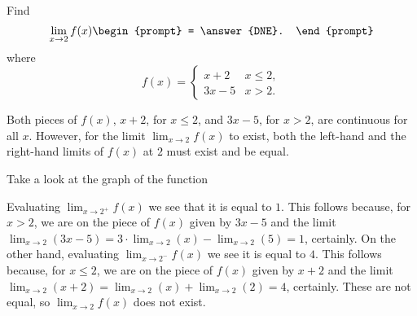 \documentclass{ximera}
\author{Gregory Hartman \and Matthew Carr}
\begin{document}
\begin{exercise}



  Find 
  \[
  \lim_{x\to 2} f(x)
  \begin{prompt}
  = \answer{DNE}.
  \end{prompt}
  \]
  where
  \[
  f(x) = \begin{cases}
    x+2 & x\leq 2, \\
    3x-5 & x>2.
  \end{cases}
  \]
    \begin{hint}
     Both pieces of $f(x)$, $x+2$, for $x\le2$, and $3x-5$, for $x>2$,
     are continuous for all $x$. However, for the limit
     $\lim_{x\to2}f(x)$ to exist, both the left-hand and the
     right-hand limits of $f(x)$ at $2$ must exist and be equal.
    \end{hint}
     \begin{hint}
    	Take a look at the graph of the function
    \begin{center}
      \end{center} 
    \end{hint}
    \begin{hint}
     Evaluating $\lim_{x\to2^{+}}f(x)$ we see that it is equal to
     $1$. This follows because, for $x>2$, we are on the piece of
     $f(x)$ given by $3x-5$ and the limit
     $\lim_{x\to2}\left({3x-5}\right)=3\cdot\lim_{x\to
       2}(x)-\lim_{x\to2}\left({5}\right)=1$, certainly. On the other
     hand, evaluating $\lim_{x\to2^{-}}f(x)$ we see it is equal to
     $4$. This follows because, for $x\le2$, we are on the piece of
     $f(x)$ given by $x+2$ and the limit
     $\lim_{x\to2}\left({x+2}\right)=\lim_{x\to2}(x)+\lim_{x\to2}\left({2}\right)=4$,
     certainly. These are not equal, so $\lim_{x\to 2}f(x)$ does not
     exist.
    \end{hint} 
\end{exercise}
\end{document}
